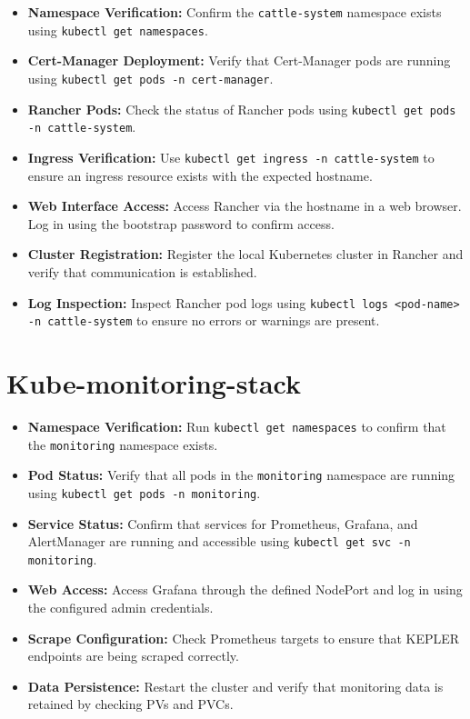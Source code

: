 \begin{itemize}
    \item \textbf{Namespace Verification:} Confirm the \texttt{cattle-system} namespace exists using \texttt{kubectl get namespaces}.
    
    \item \textbf{Cert-Manager Deployment:} Verify that Cert-Manager pods are running using \texttt{kubectl get pods -n cert-manager}.
    
    \item \textbf{Rancher Pods:} Check the status of Rancher pods using \texttt{kubectl get pods -n cattle-system}.
    
    \item \textbf{Ingress Verification:} Use \texttt{kubectl get ingress -n cattle-system} to ensure an ingress resource exists with the expected hostname.
    
    \item \textbf{Web Interface Access:} Access Rancher via the hostname in a web browser. Log in using the bootstrap password to confirm access.
    
    \item \textbf{Cluster Registration:} Register the local Kubernetes cluster in Rancher and verify that communication is established.
    
    \item \textbf{Log Inspection:} Inspect Rancher pod logs using \texttt{kubectl logs <pod-name> -n cattle-system} to ensure no errors or warnings are present.
\end{itemize}

\section{Kube-monitoring-stack}

\begin{itemize}
    \item \textbf{Namespace Verification:} Run \texttt{kubectl get namespaces} to confirm that the \texttt{monitoring} namespace exists.
    
    \item \textbf{Pod Status:} Verify that all pods in the \texttt{monitoring} namespace are running using \texttt{kubectl get pods -n monitoring}.
    
    \item \textbf{Service Status:} Confirm that services for Prometheus, Grafana, and AlertManager are running and accessible using \texttt{kubectl get svc -n monitoring}.
    
    \item \textbf{Web Access:} Access Grafana through the defined NodePort and log in using the configured admin credentials.
    
    \item \textbf{Scrape Configuration:} Check Prometheus targets to ensure that KEPLER endpoints are being scraped correctly.
    
    \item \textbf{Data Persistence:} Restart the cluster and verify that monitoring data is retained by checking PVs and PVCs.
\end{itemize}
